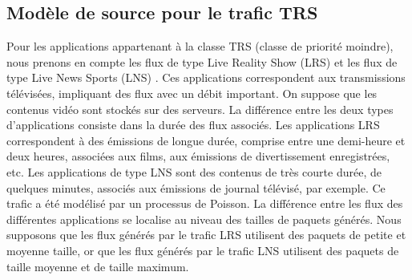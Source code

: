 \subsection{Mod\`ele de source pour le trafic TRS}
Pour les applications appartenant \`a la classe TRS (classe de priorit\'e moindre), nous prenons en compte les flux de type Live Reality Show (LRS) et les flux de type Live News Sports (LNS) \cite{classeTRS}. Ces applications correspondent aux transmissions t\'el\'evis\'ees, impliquant des flux avec un d\'ebit important. On suppose que les contenus vid\'eo sont stock\'es sur des serveurs. La diff\'erence entre les deux types d'applications consiste dans la dur\'ee des flux associ\'es. Les applications LRS correspondent \`a des \'emissions de longue dur\'ee, comprise entre une demi-heure et deux heures, associ\'ees aux films, aux \'emissions de divertissement enregistr\'ees, etc. Les applications de type LNS sont des contenus de tr\`es courte dur\'ee, de quelques minutes, associ\'es aux \'emissions de journal t\'el\'evis\'e, par exemple.  
Ce trafic a \'et\'e mod\'elis\'e par un processus de Poisson. %
La diff\'erence entre les flux des diff\'erentes applications se localise au niveau des tailles de paquets g\'en\'er\'es. 
Nous supposons que les flux g\'en\'er\'es par le trafic LRS utilisent des paquets de petite et moyenne taille, or que les flux g\'en\'er\'es par le trafic LNS utilisent des paquets de taille moyenne et de taille maximum. 

